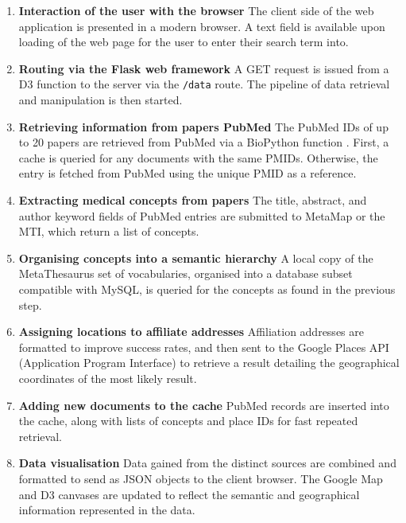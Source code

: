 \documentclass[Report.tex]{subfiles}
\begin{document}
\begin{enumerate}
\item{\textbf{Interaction of the user with the browser}} 
\newline The client side of the web application is presented in a modern browser. A text field is available upon loading of the web page for the user to enter their search term into.
\item{\textbf{Routing via the Flask web framework}}
\newline A GET request is issued from a D3 function to the server via the \texttt{/data} route. The pipeline of data retrieval and manipulation is then started.
\item{\textbf{Retrieving information from papers PubMed}}
\newline The PubMed IDs of up to 20 papers are retrieved from PubMed via a BioPython function \cite{biopython}. First, a cache is queried for any documents with the same PMIDs. Otherwise, the entry is fetched from PubMed using the unique PMID as a reference.
\item{\textbf{Extracting medical concepts from papers}}
\newline The title, abstract, and author keyword fields of PubMed entries are submitted to MetaMap or the MTI, which return a list of concepts.
\item{\textbf{Organising concepts into a semantic hierarchy}}
\newline A local copy of the MetaThesaurus set of vocabularies, organised into a database subset compatible with MySQL, is queried for the concepts as found in the previous step.
\item{\textbf{Assigning locations to affiliate addresses}}
\newline Affiliation addresses are formatted to improve success rates, and then sent to the Google Places API (Application Program Interface) to retrieve a result detailing the geographical coordinates of the most likely result.
\item{\textbf{Adding new documents to the cache}}
\newline PubMed records are inserted into the cache, along with lists of concepts and place IDs for fast repeated retrieval.
\item{\textbf{Data visualisation}}
\newline Data gained from the distinct sources are combined and formatted to send as JSON objects to the client browser. The Google Map and D3 canvases are updated to reflect the semantic and geographical information represented in the data.
\end{enumerate}\newpage
\end{document}
